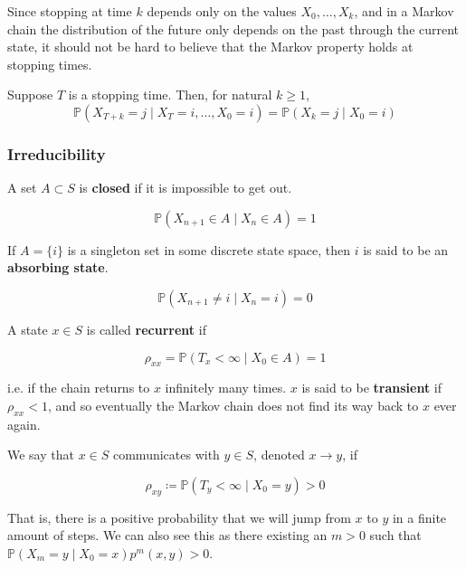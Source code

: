 \documentclass{article}
\begin{document}
      Since stopping at time $k$ depends only on the values $X_0, \ldots, X_k$, and in a Markov chain the distribution of the future only depends on the past through the current state, it should not be hard to believe that the Markov property holds at stopping times. 

      \begin{theorem}
        Suppose $T$ is a stopping time. Then, for natural $k \geq 1$, 
          \[\mathbb{P}(X_{T + k} = j \mid X_T = i, \ldots, X_0 = i) = \mathbb{P}(X_k = j \mid X_0 = i) \]
      \end{theorem}

    \subsubsection{Irreducibility}

      \begin{definition}
        A set $A \subset S$ is \textbf{closed} if it is impossible to get out. 

          \[\mathbb{P}(X_{n + 1} \in A \mid X_n \in A) = 1\]

        If $A = \{i\}$ is a singleton set in some discrete state space, then $i$ is said to be an \textbf{absorbing state}. 

          \[\mathbb{P}(X_{n+1} \neq i \; | \; X_n = i) = 0\]
      \end{definition}

      \begin{definition}
        A state $x \in S$ is called \textbf{recurrent} if 

          \[\rho_{xx} = \mathbb{P}(T_x < \infty \mid X_0 \in A) = 1\]

        i.e. if the chain returns to $x$ infinitely many times. $x$ is said to be \textbf{transient} if $\rho_{xx} < 1$, and so eventually the Markov chain does not find its way back to $x$ ever again. 
      \end{definition}

      \begin{definition}[Communication]
        We say that $x \in S$ communicates with $y \in S$, denoted $x \rightarrow y$, if 

          \[\rho_{xy} \coloneqq \mathbb{P}(T_y < \infty \mid X_0 = y) > 0\]

        That is, there is a positive probability that we will jump from $x$ to $y$ in a finite amount of steps. We can also see this as there existing an $m > 0$ such that $\mathbb{P}(X_m = y \mid X_0 = x) p^m (x, y) > 0$. 
      \end{definition}
\end{document}
